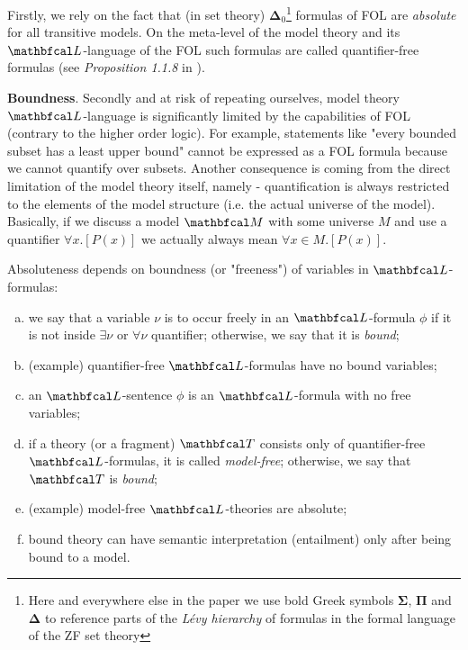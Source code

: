 Firstly, we rely on the fact that (in set theory) $\boldsymbol{\Delta}_0$\footnote{Here and everywhere else in the paper we use bold Greek symbols $\boldsymbol{\Sigma}$, $\boldsymbol{\Pi}$ and $\boldsymbol{\Delta}$ to reference parts of the \textit{Lévy hierarchy} of formulas in the formal language of the ZF set theory} formulas of FOL are \textit{absolute} for all transitive models. On the meta-level of the model theory and its $\lsign$-language of the FOL such formulas are called quantifier-free formulas (see \textit{Proposition 1.1.8} in \cite{marker2002model}). 

\textbf{Boundness}. Secondly and at risk of repeating ourselves, model theory $\lsign$-language \cite{marker2002model} is significantly limited by the capabilities of FOL (contrary to the higher order logic). For example, statements like "every bounded subset has a least upper bound" cannot be expressed as a FOL formula because we cannot quantify over subsets. Another consequence is coming from the direct limitation of the model theory itself, namely - quantification is always restricted to the elements of the model structure (i.e. the actual universe of the model). Basically, if we discuss a model $\LsM$ with some universe $M$ and use a quantifier $\forall x.[P(x)]$ we actually always mean $\forall x \in M.[P(x)]$.

\begin{definition} 
Absoluteness depends on boundness (or "freeness") of variables in $\lsign$-formulas:
\begin{enumerate}[(a)]
  \item we say that a variable $\nu$ is to occur freely in an $\lsign$-formula $\phi$ if it is not inside $\exists \nu$ or $\forall \nu$ quantifier; otherwise, we say that it is \textit{bound};
  \item (example) quantifier-free $\lsign$-formulas have no bound variables;
  \item an $\lsign$-sentence $\phi$ is an $\lsign$-formula with no free variables;
  \item if a theory (or a fragment) $\LsT$ consists only of quantifier-free $\lsign$-formulas, it is called \textit{model-free}; otherwise, we say that $\LsT$ is \textit{bound};
  \item (example) model-free $\lsign$-theories are absolute;
  \item bound theory can have semantic interpretation (entailment) only after being bound to a model. 
\end{enumerate}
\end{definition} 

